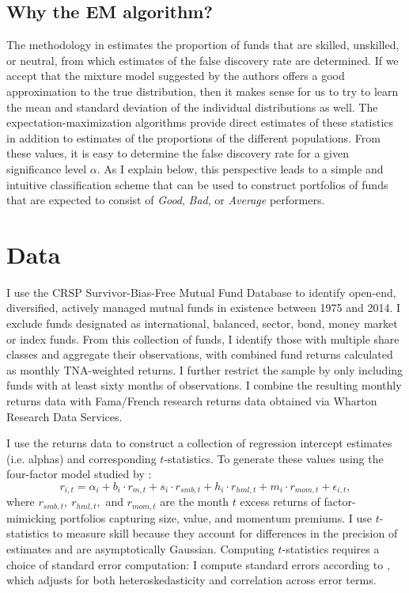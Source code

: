 \subsection{Why the EM algorithm?}
The methodology in \citet{Barras2010} estimates the proportion of funds that are skilled, unskilled, or neutral, from which estimates of the false discovery rate are determined. If we accept that the mixture model suggested by the authors offers a good approximation to the true distribution, then it makes sense for us to try to learn the mean and standard deviation of the individual distributions as well. The expectation-maximization algorithms provide direct estimates of these statistics in addition to estimates of the proportions of the different populations. From these values, it is easy to determine the false discovery rate for a given significance level $\alpha$. As I explain below, this perspective leads to a simple and intuitive classification scheme that can be used to construct portfolios of funds that are expected to consist of \textit{Good}, \textit{Bad}, or \textit{Average} performers.


\section{Data}
\label{sec:chp2_data}

I use the CRSP Survivor-Bias-Free Mutual Fund Database to identify open-end, diversified, actively managed mutual funds in existence between 1975 and 2014.  I exclude funds designated as international, balanced, sector, bond, money market or index funds.  From this collection of funds, I identify those with multiple share classes and aggregate their observations, with combined fund returns calculated as monthly TNA-weighted returns.  I further restrict the sample by only including funds with at least sixty months of observations.  I combine the resulting monthly returns data with Fama/French research returns data obtained via Wharton Research Data Services.

I use the returns data to construct a collection of regression intercept estimates (i.e. alphas) and corresponding $t$-statistics. To generate these values using the four-factor model studied by \citet{Carhart1997}:
%
\begin{equation} \label{eqn:carhart} r_{i, t} = \alpha_{i} + b_{i} \cdot r_{m, t} + s_{i} \cdot r_{smb, t} + h_{i} \cdot r_{hml, t} + m_{i} \cdot r_{mom, t} + \epsilon_{i, t}, \end{equation}
%
where $r_{smb, t}, \ r_{hml, t},$ and $r_{mom, t}$ are the month $t$ excess returns of factor-mimicking portfolios capturing size, value, and momentum premiums.  I use $t$-statistics to measure skill because they account for differences in the precision of estimates and are asymptotically Gaussian.  Computing $t$-statistics requires a choice of standard error computation: I compute standard errors according to \citet{Newey1994}, which adjusts for both heteroskedasticity and correlation across error terms.

